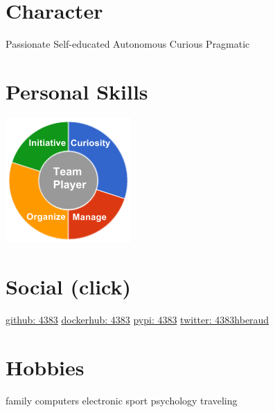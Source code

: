 \documentclass[]{friggeri-cv}
\begin{document}
\begin{aside}
~
~
~
    \section{Character}
        Passionate
        Self-educated
        Autonomous
        Curious
        Pragmatic
        ~
    \section{Personal Skills}
        \includegraphics[scale=0.62]{img/personal.png}
        ~
    \section{Social (click)}
        \href{https://github.com/4383}{github: 4383}
        \href{https://hub.docker.com/r/4383}{dockerhub: 4383}
        \href{https://warehouse.python.org/user/4383/}{pypi: 4383}
        \href{https://twitter.com/4383hberaud}{twitter: 4383hberaud}
        ~
    \section{Hobbies}
        family
        computers
        electronic
        sport
        psychology
        traveling
\end{aside}
\end{document}
